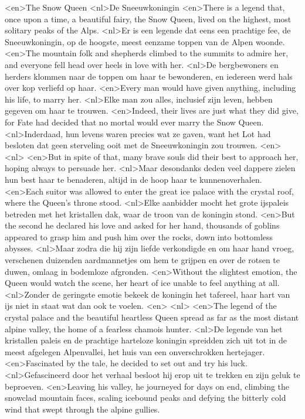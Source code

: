 <en>The Snow Queen
<nl>De Sneeuwkoningin
<en>There is a legend that, once upon a time, a beautiful fairy, the Snow Queen, lived on the highest, most solitary peaks of the Alps.
<nl>Er is een legende dat eens een prachtige fee, de Sneeuwkoningin, op de hoogste, meest eenzame toppen van de Alpen woonde.
<en>The mountain folk and shepherds climbed to the summits to admire her, and everyone fell head over heels in love with her.
<nl>De bergbewoners en herders klommen naar de toppen om haar te bewonderen, en iedereen werd hals over kop verliefd op haar.
<en>Every man would have given anything, including his life, to marry her.
<nl>Elke man zou alles, inclusief zijn leven, hebben gegeven om haar te trouwen.
<en>Indeed, their lives are just what they did give, for Fate had decided that no mortal would ever marry the Snow Queen.
<nl>Inderdaad, hun levens waren precies wat ze gaven, want het Lot had besloten dat geen sterveling ooit met de Sneeuwkoningin zou trouwen.
<en>
<nl>
<en>But in spite of that, many brave souls did their best to approach her, hoping always to persuade her.
<nl>Maar desondanks deden veel dappere zielen hun best haar te benaderen, altijd in de hoop haar te kunnenoverhalen.
<en>Each suitor was allowed to enter the great ice palace with the crystal roof, where the Queen’s throne stood.
<nl>Elke aanbidder mocht het grote ijspaleis betreden met het kristallen dak, waar de troon van de koningin stond.
<en>But the second he declared his love and asked for her hand, thousands of goblins appeared to grasp him and push him over the rocks, down into bottomless abysses.
<nl>Maar zodra die hij zijn liefde verkondigde en om haar hand vroeg, verschenen duizenden aardmannetjes om hem te grijpen en over de rotsen te duwen, omlaag in bodemloze afgronden.
<en>Without the slightest emotion, the Queen would watch the scene, her heart of ice unable to feel anything at all.
<nl>Zonder de geringste emotie bekeek de koningin het tafereel, haar hart van ijs niet in staat wat dan ook te voelen.
<en>
<nl>
<en>The legend of the crystal palace and the beautiful heartless Queen spread as far as the most distant alpine valley, the home of a fearless chamois hunter.
<nl>De legende van het kristallen paleis en de prachtige harteloze koningin spreidden zich uit tot in de meest afgelegen Alpenvallei, het huis van een onverschrokken hertejager.
<en>Fascinated by the tale, he decided to set out and try his luck.
<nl>Gefascineerd door het verhaal besloot hij erop uit te trekken en zijn geluk te beproeven.
<en>Leaving his valley, he journeyed for days on end, climbing the snowclad mountain faces, scaling icebound peaks and defying the bitterly cold wind that swept through the alpine gullies.

